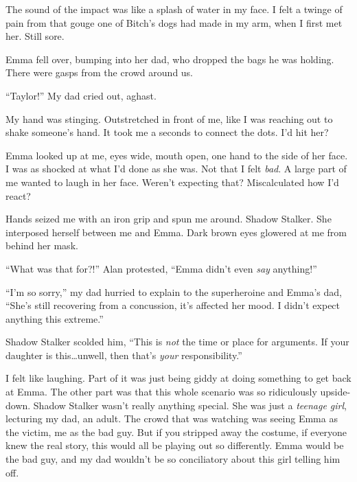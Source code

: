 The sound of the impact was like a splash of water in my face.  I felt a twinge of pain from that gouge one of Bitch's dogs had made in my arm, when I first met her.  Still sore.



Emma fell over, bumping into her dad, who dropped the bags he was holding.  There were gasps from the crowd around us.



``Taylor!'' My dad cried out, aghast.



My hand was stinging.  Outstretched in front of me, like I was reaching out to shake someone's hand.  It took me a seconds to connect the dots.  I'd hit her?



Emma looked up at me, eyes wide, mouth open, one hand to the side of her face.  I was as shocked at what I'd done as she was.  Not that I felt \emph{bad}.  A large part of me wanted to laugh in her face.  Weren't expecting that?  Miscalculated how I'd react?



Hands seized me with an iron grip and spun me around.  Shadow Stalker.  She interposed herself between me and Emma.  Dark brown eyes glowered at me from behind her mask.



``What was that for?!'' Alan protested, ``Emma didn't even \emph{say} anything!''



``I'm so sorry,'' my dad hurried to explain to the superheroine and Emma's dad, ``She's still recovering from a concussion, it's affected her mood.  I didn't expect anything this extreme.''



Shadow Stalker scolded him, ``This is \emph{not} the time or place for arguments.  If your daughter is this\ldots unwell, then that's \emph{your} responsibility.''



I felt like laughing.  Part of it was just being giddy at doing something to get back at Emma.  The other part was that this whole scenario was so ridiculously upside-down.  Shadow Stalker wasn't really anything special.  She was just a \emph{teenage girl}, lecturing my dad, an adult.  The crowd that was watching was seeing Emma as the victim, me as the bad guy.  But if you stripped away the costume, if everyone knew the real story, this would all be playing out so differently.  Emma would be the bad guy, and my dad wouldn't be so conciliatory about this girl telling him off.



